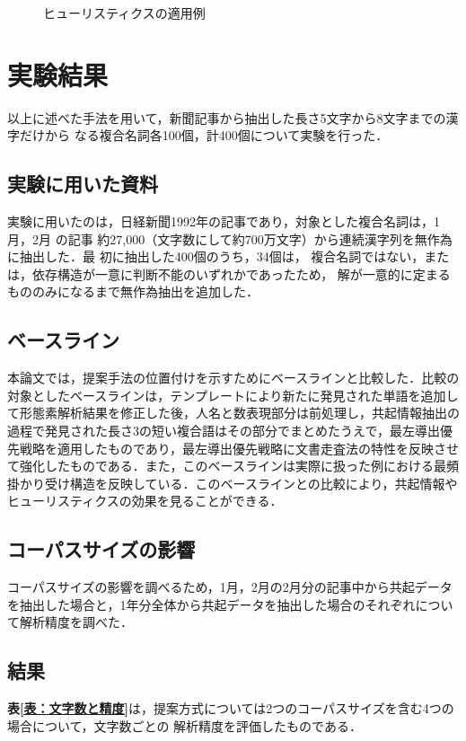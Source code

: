 \begin{figure}[tbp]
  \begin{center}
    \leavevmode
  \end{center}
  \caption{ヒューリスティクスの適用例}
  \label{fig:heuristics}
\end{figure}

\section{実験結果}\label{実験結果}
以上に述べた手法を用いて，新聞記事から抽出した長さ5文字から8文字までの漢字だけから\break
なる複合名詞各100個，計400個について実験を行った．

\subsection{実験に用いた資料}\label{実験に用いた資料}
実験に用いたのは，日経新聞1992年の記事であり，対象とした複合名詞は，1月，2月
の記事\break
約27,000（文字数にして約700万文字）から連続漢字列を無作為に抽出した．最
初に抽出した400個のうち，34個は，
複合名詞ではない，または，依存構造が一意に判断不能のいずれかであったため，
解が一意的に定まるもののみになるまで無作為抽出を追加した．

\subsection{ベースライン}\label{ベースライン}
本論文では，提案手法の位置付けを示すためにベースラインと比較した．比較の対象としたベースラインは，テンプレートにより新たに発見された単語を追加して形態素解析結果を修正した後，人名と数表現部分は前処理し，共起情報抽出の過程で発見された長さ3の短い複合語はその部分でまとめたうえで，最左導出優先戦略を適用したものであり，最左導出優先戦略に文書走査法の特性を反映させて強化したものである．また，このベースラインは実際に扱った例における最頻掛かり受け構造を反映している．このベースラインとの比較により，共起情報やヒューリスティクスの効果を見ることができる．

\subsection{コーパスサイズの影響}\label{コーパスサイズの影響}
コーパスサイズの影響を調べるため，1月，2月の2月分の記事中から共起データを抽出した場合と，1年分全体から共起データを抽出した場合のそれぞれについて解析精度を調べた．

\subsection{結果}\label{結果}
{\bf 表\ref{表：文字数と精度}}は，提案方式については2つのコーパスサイズを含む4つの場合について，文字数ごとの\break
解析精度を評価したものである．

